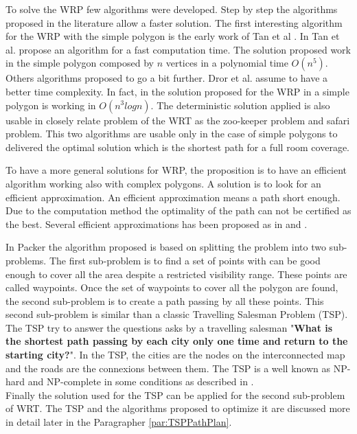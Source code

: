 To solve the WRP few algorithms were developed. Step by step the algorithms proposed in the literature allow a faster solution. The first interesting algorithm for the WRP with the simple polygon is the early work of Tan et al \cite{234*tan2001}. In Tan et al.\citep{234*tan2001}  propose an algorithm for a fast computation time. The solution proposed work in the simple polygon composed by $n$ vertices in a polynomial time $O(n^5)$. \\
Others algorithms proposed to go a bit further. Dror et al. \cite{233*dror2003} assume to have a better  time complexity. In fact, in \cite{233*dror2003} the solution proposed for the WRP in a simple polygon is working in $O(n^3 log n)$.  The deterministic solution applied is also usable in closely relate problem of the WRT as the zoo-keeper problem and safari problem.
This two algorithms \citep{234*tan2001,233*dror2003} are usable only in the case of simple polygons to delivered the optimal solution which is the shortest path for a full room coverage. 

To have a more general solutions for WRP, the proposition is to have an efficient algorithm working also with complex polygons. A solution is to look for an efficient approximation. An efficient approximation means a path short enough.  Due to the computation method the optimality of the path can not be certified as the best.
Several efficient approximations has been proposed as in \citep{235*faigl2010} and \citep{53*packer2008}. 

In Packer \citep{53*packer2008}  the algorithm proposed is based on splitting the problem into two sub-problems. The first sub-problem is to find a set of points with can be good enough to cover all the area despite a restricted visibility range. These points are called waypoints.  
Once the set of waypoints to cover all the polygon are found, the second sub-problem is to create a path passing by all these points. 
 This second sub-problem is similar than a classic Travelling Salesman Problem (TSP). The TSP try to answer the questions asks by a travelling salesman "\textbf{What is the shortest path passing by each city only one time and return to the starting city?}".
  In the TSP, the cities are the nodes on the interconnected map and the roads are the connexions between them. The TSP is a well known as NP-hard and NP-complete in  some conditions as described in \citep{236*karp1972}. \\ 
Finally the solution used for the TSP can be applied for the second sub-problem of WRT.
 The TSP and the algorithms proposed to optimize it are discussed more in detail later in the Paragrapher \ref{par:TSPPathPlan}.

